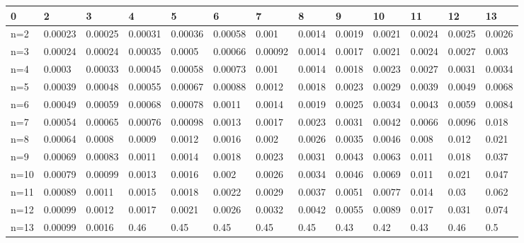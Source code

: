 \begin{tabular}{l|llllllllllll}
\toprule 
0 & 2 & 3 & 4 & 5 & 6 & 7 & 8 & 9 & 10 & 11 & 12 & 13 \\
\hline 
n=2 & 0.00023 & 0.00025 & 0.00031 & 0.00036 & 0.00058 & 0.001 & 0.0014 & 0.0019 & 0.0021 & 0.0024 & 0.0025 & 0.0026 \\
n=3 & 0.00024 & 0.00024 & 0.00035 & 0.0005 & 0.00066 & 0.00092 & 0.0014 & 0.0017 & 0.0021 & 0.0024 & 0.0027 & 0.003 \\
n=4 & 0.0003 & 0.00033 & 0.00045 & 0.00058 & 0.00073 & 0.001 & 0.0014 & 0.0018 & 0.0023 & 0.0027 & 0.0031 & 0.0034 \\
n=5 & 0.00039 & 0.00048 & 0.00055 & 0.00067 & 0.00088 & 0.0012 & 0.0018 & 0.0023 & 0.0029 & 0.0039 & 0.0049 & 0.0068 \\
n=6 & 0.00049 & 0.00059 & 0.00068 & 0.00078 & 0.0011 & 0.0014 & 0.0019 & 0.0025 & 0.0034 & 0.0043 & 0.0059 & 0.0084 \\
n=7 & 0.00054 & 0.00065 & 0.00076 & 0.00098 & 0.0013 & 0.0017 & 0.0023 & 0.0031 & 0.0042 & 0.0066 & 0.0096 & 0.018 \\
n=8 & 0.00064 & 0.0008 & 0.0009 & 0.0012 & 0.0016 & 0.002 & 0.0026 & 0.0035 & 0.0046 & 0.008 & 0.012 & 0.021 \\
n=9 & 0.00069 & 0.00083 & 0.0011 & 0.0014 & 0.0018 & 0.0023 & 0.0031 & 0.0043 & 0.0063 & 0.011 & 0.018 & 0.037 \\
n=10 & 0.00079 & 0.00099 & 0.0013 & 0.0016 & 0.002 & 0.0026 & 0.0034 & 0.0046 & 0.0069 & 0.011 & 0.021 & 0.047 \\
n=11 & 0.00089 & 0.0011 & 0.0015 & 0.0018 & 0.0022 & 0.0029 & 0.0037 & 0.0051 & 0.0077 & 0.014 & 0.03 & 0.062 \\
n=12 & 0.00099 & 0.0012 & 0.0017 & 0.0021 & 0.0026 & 0.0032 & 0.0042 & 0.0055 & 0.0089 & 0.017 & 0.031 & 0.074 \\
n=13 & 0.00099 & 0.0016 & 0.46 & 0.45 & 0.45 & 0.45 & 0.45 & 0.43 & 0.42 & 0.43 & 0.46 & 0.5 \\
\bottomrule 
\end{tabular}
